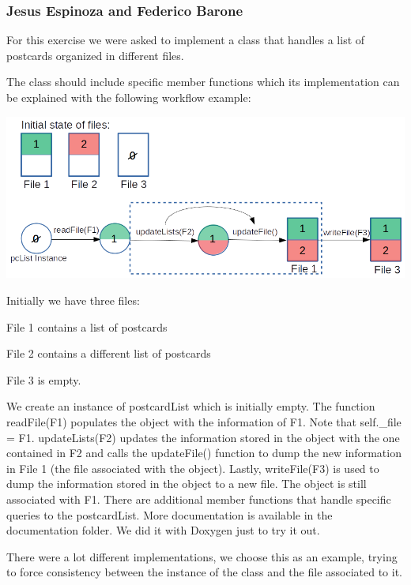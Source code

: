 \subsubsection*{Jesus Espinoza and Federico Barone}

\DoxyHorRuler


For this exercise we were asked to implement a class that handles a list of postcards organized in different files.

The class should include specific member functions which its implementation can be explained with the following workflow example\+:

 
\begin{DoxyImage}
\includegraphics[width=\textwidth,height=\textheight/2,keepaspectratio=true]{py_workflow.png}
\end{DoxyImage}
  

Initially we have three files\+:


\begin{DoxyItemize}
\item File 1 contains a list of postcards
\item File 2 contains a different list of postcards
\item File 3 is empty.
\end{DoxyItemize}

We create an instance of {\ttfamily postcard\+List} which is initially empty. The function {\ttfamily read\+File(\+F1)} populates the object with the information of F1. Note that self.\+\_\+file = F1. {\ttfamily update\+Lists(\+F2)} updates the information stored in the object with the one contained in F2 and calls the {\ttfamily update\+File()} function to dump the new information in File 1 (the file associated with the object). Lastly, {\ttfamily write\+File(\+F3)} is used to dump the information stored in the object to a new file. The object is still associated with F1. There are additional member functions that handle specific queries to the postcard\+List. More documentation is available in the documentation folder. We did it with {\ttfamily Doxygen} just to try it out.

There were a lot different implementations, we choose this as an example, trying to force consistency between the instance of the class and the file associated to it. 
